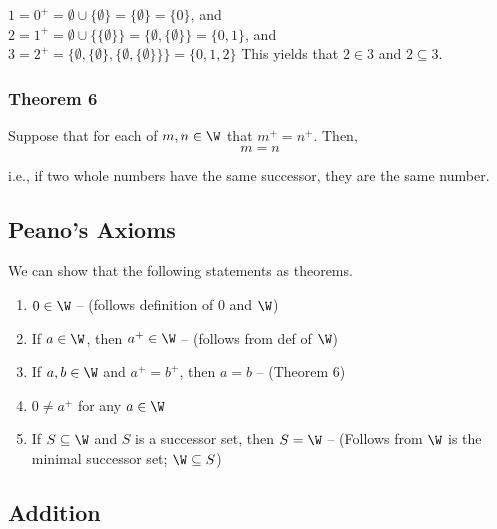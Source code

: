         \begin{example}
            $1 = 0^+ = \emptyset \cup \{\emptyset\} = \{\emptyset\} = \{0\}$, and \\
            $2 = 1^+ = \emptyset \cup \{\{\emptyset\}\} = \{\emptyset, \{\emptyset\}\} = \{0,1\}$, and \\
            $3 = 2^+ = \{\emptyset, \{\emptyset\}, \{\emptyset, \{\emptyset\}\}\} = \{0,1,2\}$
            This yields that $2\in 3$ and $2\subseteq 3$.
        \end{example}

        \subsubsection{Theorem 6}

            \begin{ntheorem}
                Suppose that for each of $m,n\in \W$ that $m^+ = n^+$. Then, $$m = n$$
            \end{ntheorem}
            i.e., if two whole numbers have the same successor, they are the same number.

    \subsection{Peano's Axioms}

        We can show that the following statements as theorems. \\

        \begin{enumerate}
            \item $0 \in \W$ -- (follows definition of $0$ and $\W$) 
            \item If $a\in \W$, then $a^+ \in \W$ -- (follows from def of $\W$)
            \item If $a,b\in \W$ and $a^+ = b^+$, then $a = b$ -- (Theorem 6)
            \item $0 \ne a^+$ for any $a\in \W$
            \item If $S \subseteq \W$ and $S$ is a successor set, then $S = \W$ -- (Follows from $\W$ is the minimal successor set; $\W \subseteq S$)
        \end{enumerate}

\newpage 

\subsection{Addition}



